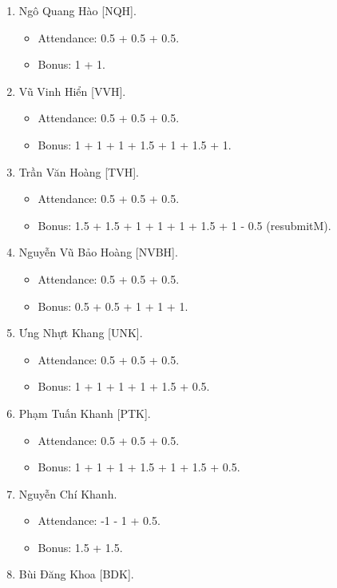 \documentclass{article}
\begin{document}
\begin{enumerate}
    \item {\sc Ngô Quang Hào [NQH].}
    \begin{itemize}
        \item Attendance: 0.5 + 0.5 + 0.5.
        \item Bonus: 1 + 1.
    \end{itemize}
    \item {\sc Vũ Vinh Hiển [VVH].}
    \begin{itemize}
        \item Attendance: 0.5 + 0.5 + 0.5.
        \item Bonus: 1 + 1 + 1 + 1.5 + 1 + 1.5 + 1.
    \end{itemize}
    \item {\sc Trần Văn Hoàng [TVH].}
    \begin{itemize}
        \item Attendance: 0.5 + 0.5 + 0.5.
        \item Bonus: 1.5 + 1.5 + 1 + 1 + 1 + 1.5 + 1 - 0.5 (resubmitM).
    \end{itemize}
    \item {\sc Nguyễn Vũ Bảo Hoàng [NVBH].}
    \begin{itemize}
        \item Attendance: 0.5 + 0.5 + 0.5.
        \item Bonus: 0.5 + 0.5 + 1 + 1 + 1.
    \end{itemize}
    \item {\sc Ưng Nhựt Khang [UNK].}
    \begin{itemize}
        \item Attendance: 0.5 + 0.5 + 0.5.
        \item Bonus: 1 + 1 + 1 + 1 + 1.5 + 0.5.
    \end{itemize}
    \item {\sc Phạm Tuấn Khanh [PTK].}
    \begin{itemize}
        \item Attendance: 0.5 + 0.5 + 0.5.
        \item Bonus: 1 + 1 + 1 + 1.5 + 1 + 1.5 + 0.5.
    \end{itemize}
    \item {\sc Nguyễn Chí Khanh.}
    \begin{itemize}
        \item Attendance: -1 - 1 + 0.5.
        \item Bonus: 1.5 + 1.5.
    \end{itemize}
    \item {\sc Bùi Đăng Khoa [BDK].}

\end{enumerate}
\end{document}
